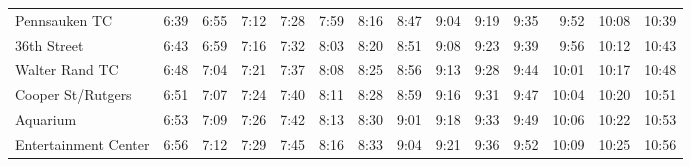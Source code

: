 \begin{center}
\begin{tabular}{@{}lrrrrrrrrrrrrr@{}}
Pennsauken TC & 6:39 & 6:55 & 7:12 & 7:28 & 7:59 & 8:16 & 8:47 & 9:04 & 9:19 & 9:35 & 9:52 & 10:08 & 10:39 \\
36th Street & 6:43 & 6:59 & 7:16 & 7:32 & 8:03 & 8:20 & 8:51 & 9:08 & 9:23 & 9:39 & 9:56 & 10:12 & 10:43 \\
Walter Rand TC & 6:48 & 7:04 & 7:21 & 7:37 & 8:08 & 8:25 & 8:56 & 9:13 & 9:28 & 9:44 & 10:01 & 10:17 & 10:48 \\
Cooper St/Rutgers & 6:51 & 7:07 & 7:24 & 7:40 & 8:11 & 8:28 & 8:59 & 9:16 & 9:31 & 9:47 & 10:04 & 10:20 & 10:51 \\
Aquarium & 6:53 & 7:09 & 7:26 & 7:42 & 8:13 & 8:30 & 9:01 & 9:18 & 9:33 & 9:49 & 10:06 & 10:22 & 10:53 \\
Entertainment Center & 6:56 & 7:12 & 7:29 & 7:45 & 8:16 & 8:33 & 9:04 & 9:21 & 9:36 & 9:52 & 10:09 & 10:25 & 10:56 \\
\bottomrule\end{tabular}\end{center}
